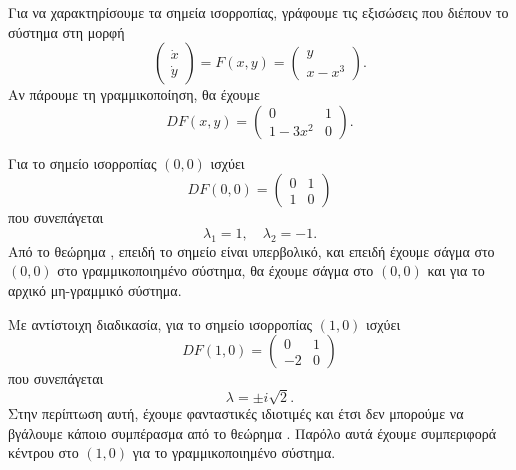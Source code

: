 \begin{solution}
    Για να χαρακτηρίσουμε τα σημεία ισορροπίας, γράφουμε τις εξισώσεις που
    διέπουν το σύστημα στη μορφή
    \begin{equation*}
        \begin{pmatrix}
            \dot{x} \\
            \dot{y}
        \end{pmatrix} = F(x, y) =
        \begin{pmatrix}
            y \\
            x - x^3
        \end{pmatrix}.
    \end{equation*}
    Αν πάρουμε τη γραμμικοποίηση, θα έχουμε
    \begin{equation*}
        DF(x, y) =
        \begin{pmatrix}
            0 & 1 \\
            1 - 3x^2 & 0
        \end{pmatrix}.
    \end{equation*}

    Για το σημείο ισορροπίας \( (0, 0) \) ισχύει
    \begin{equation*}
        DF(0, 0) =
        \begin{pmatrix}
            0 & 1 \\
            1 & 0
        \end{pmatrix}
    \end{equation*}
    που συνεπάγεται
    \begin{equation*}
        \lambda_1 = 1, \quad \lambda_2 = -1.
    \end{equation*}
    Από το θεώρημα , επειδή το σημείο είναι
    υπερβολικό, και επειδή έχουμε σάγμα στο \( (0, 0) \) στο γραμμικοποιημένο
    σύστημα, θα έχουμε σάγμα στο \( (0, 0) \) και για το αρχικό μη-γραμμικό
    σύστημα.

    Με αντίστοιχη διαδικασία, για το σημείο ισορροπίας \( (1, 0) \) ισχύει
    \begin{equation*}
        DF(1, 0) =
        \begin{pmatrix}
            0 & 1 \\
            -2 & 0
        \end{pmatrix}
    \end{equation*}
    που συνεπάγεται
    \begin{equation*}
        \lambda = \pm i\sqrt{2}.
    \end{equation*}
    Στην περίπτωση αυτή, έχουμε φανταστικές ιδιοτιμές και έτσι δεν μπορούμε να
    βγάλουμε κάποιο συμπέρασμα από το θεώρημα . Παρόλο αυτά
    έχουμε συμπεριφορά κέντρου στο \( (1, 0) \) για το γραμμικοποιημένο σύστημα.


\end{solution}
